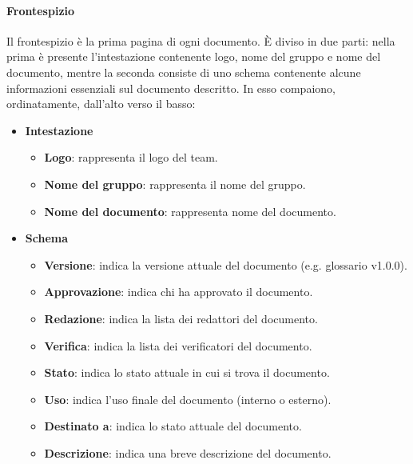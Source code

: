 \documentclass[../norme-di-progetto.tex]{subfiles}
\begin{document}
\paragraph{Frontespizio}
\label{par:frontespizio}
Il frontespizio è la prima pagina di ogni documento. È diviso in due parti: nella prima è presente l'intestazione contenente logo, nome del gruppo e nome del documento, mentre la seconda consiste di uno schema contenente alcune informazioni essenziali sul documento descritto. In esso compaiono, ordinatamente, dall'alto verso il basso:
\begin{itemize}
	\item \textbf{Intestazione}
	\begin{itemize}
		\item \textbf{Logo}: rappresenta il logo del team.
		\item \textbf{Nome del gruppo}: rappresenta il nome del gruppo.
		\item \textbf{Nome del documento}: rappresenta nome del documento.
	\end{itemize}
	\item \textbf{Schema}
	\begin{itemize}
		\item \textbf{Versione}: indica la versione attuale del documento (e.g. glossario v1.0.0).
		\item \textbf{Approvazione}: indica chi ha approvato il documento.
		\item \textbf{Redazione}: indica la lista dei redattori del documento.
		\item \textbf{Verifica}: indica la lista dei verificatori del documento.
		\item \textbf{Stato}: indica lo stato attuale in cui si trova il documento.
		\item \textbf{Uso}: indica l'uso finale del documento (interno o esterno).
		\item \textbf{Destinato a}: indica lo stato attuale del documento.
		\item \textbf{Descrizione}: indica una breve descrizione del documento. 
	\end{itemize}
\end{itemize}
\end{document}
